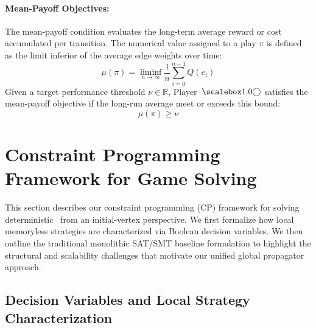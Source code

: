 \documentclass[preprint,12pt,authoryear]{elsarticle}
\begin{document}
\paragraph{Mean-Payoff Objectives:}
The mean-payoff condition evaluates the long-term average reward or cost accumulated per transition. The numerical value assigned to a play $\pi$ is defined as the limit inferior of the average edge weights over time:
\[
\mu(\pi) = \liminf_{n \to \infty} \frac{1}{n} \sum_{i=0}^{n-1} Q(e_i)
\]
Given a target performance threshold $\nu \in \mathbb{R}$, Player~$\even$ satisfies the mean-payoff objective if the long-run average meet or exceeds this bound:
\[
\mu(\pi) \geq \nu
\]



\section{Constraint Programming Framework for Game Solving}
\label{sec:cp_framework}

This section describes our constraint programming (CP) framework for solving deterministic \wregulargames\ from an initial-vertex perspective. We first formalize how local memoryless strategies are characterized via Boolean decision variables. We then outline the traditional monolithic SAT/SMT baseline formulation to highlight the structural and scalability challenges that motivate our unified global propagator approach.

\subsection{Decision Variables and Local Strategy Characterization}
\label{subsec:variables_local}
\end{document}

